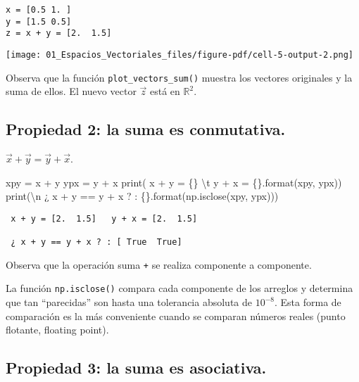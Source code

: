 \documentclass[
  letterpaper,
  DIV=11,
  numbers=noendperiod]{scrreprt}
\newenvironment{Shaded}{\begin{snugshade}}{\end{snugshade}}
\newcommand{\BuiltInTok}[1]{\textcolor[rgb]{0.00,0.23,0.31}{#1}}
\newcommand{\CharTok}[1]{\textcolor[rgb]{0.13,0.47,0.30}{#1}}
\newcommand{\NormalTok}[1]{\textcolor[rgb]{0.00,0.23,0.31}{#1}}
\newcommand{\OperatorTok}[1]{\textcolor[rgb]{0.37,0.37,0.37}{#1}}
\newcommand{\SpecialCharTok}[1]{\textcolor[rgb]{0.37,0.37,0.37}{#1}}
\newcommand{\StringTok}[1]{\textcolor[rgb]{0.13,0.47,0.30}{#1}}
\begin{document}
\begin{verbatim}
x = [0.5 1. ]
y = [1.5 0.5]
z = x + y = [2.  1.5]
\end{verbatim}

\texttt{[image: 01\_Espacios\_Vectoriales\_files/figure-pdf/cell-5-output-2.png]}

Observa que la función \texttt{plot\_vectors\_sum()} muestra los
vectores originales y la suma de ellos. El nuevo vector \(\vec{z}\) está
en \(\mathbb{R}^2\).

\subsection{Propiedad 2: la suma es
conmutativa.}\label{propiedad-2-la-suma-es-conmutativa.}

\(\vec{x} + \vec{y} = \vec{y} + \vec{x}\).

\begin{Shaded}
\begin{Highlighting}[]
\NormalTok{xpy }\OperatorTok{=}\NormalTok{ x }\OperatorTok{+}\NormalTok{ y}
\NormalTok{ypx }\OperatorTok{=}\NormalTok{ y }\OperatorTok{+}\NormalTok{ x}
\BuiltInTok{print}\NormalTok{(}\StringTok{\textquotesingle{} x + y = }\SpecialCharTok{\{\}}\StringTok{ }\CharTok{\textbackslash{}t}\StringTok{ y + x = }\SpecialCharTok{\{\}}\StringTok{\textquotesingle{}}\NormalTok{.}\BuiltInTok{format}\NormalTok{(xpy, ypx))}
\BuiltInTok{print}\NormalTok{(}\StringTok{\textquotesingle{}}\CharTok{\textbackslash{}n}\StringTok{ ¿ x + y == y + x ? : }\SpecialCharTok{\{\}}\StringTok{\textquotesingle{}}\NormalTok{.}\BuiltInTok{format}\NormalTok{(np.isclose(xpy, ypx)))}
\end{Highlighting}
\end{Shaded}

\begin{verbatim}
 x + y = [2.  1.5]   y + x = [2.  1.5]

 ¿ x + y == y + x ? : [ True  True]
\end{verbatim}

Observa que la operación suma \texttt{+} se realiza componente a
componente.

La función \texttt{np.isclose()} compara cada componente de los arreglos
y determina que tan ``parecidas'' son hasta una tolerancia absoluta de
\(10^{-8}\). Esta forma de comparación es la más conveniente cuando se
comparan números reales (punto flotante, floating point).

\subsection{Propiedad 3: la suma es
asociativa.}\label{propiedad-3-la-suma-es-asociativa.}
\end{document}
